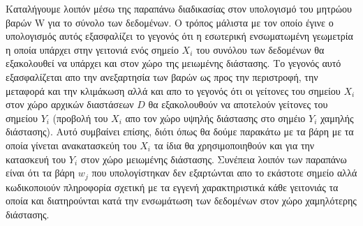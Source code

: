 \par
Καταλήγουμε λοιπόν μέσω της παραπάνω διαδικασίας στον υπολογισμό του μητρώου βαρών \textlatin{W} για το σύνολο των δεδομένων. Ο τρόπος μάλιστα με τον οποίο έγινε ο υπολογισμός αυτός εξασφαλίζει το γεγονός ότι η εσωτερική ενσωματωμένη γεωμετρία η οποία υπάρχει στην γειτονιά ενός σημείο $X_{i}$ του συνόλου των δεδομένων θα εξακολουθεί να υπάρχει και στον χώρο της μειωμένης διάστασης. Το γεγονός αυτό εξασφαλίζεται απο την ανεξαρτησία των βαρών ως προς την περιστροφή, την μεταφορά και την κλιμάκωση αλλά και απο το γεγονός ότι οι γείτονες του σημείου $X_{i}$ στον χώρο αρχικών διαστάσεων $D$ θα εξακολουθούν να αποτελούν γείτονες του σημείου $Y_{i}$ (προβολή του $X_{i}$ απο τον χώρο υψηλής διάστασης στο σημέιο $Y_{i}$ χαμηλής διάστασης). Αυτό συμβαίνει επίσης, διότι όπως θα δούμε παρακάτω με τα βάρη με τα οποία γίνεται ανακατασκεύη του $X_{i}$ τα ίδια θα χρησιμοποιηθούν και για την κατασκευή του $Y_{i}$ στον χώρο μειωμένης διάστασης. Συνέπεια λοιπόν των παραπάνω είναι ότι τα βάρη $w_{j}$ που υπολογίστηκαν δεν εξαρτώνται απο το εκάστοτε σημείο αλλά κωδικοποιούν πληροφορία σχετική με τα εγγενή χαρακτηριστικά κάθε γειτονιάς τα οποία και διατηρούνται κατά την ενσωμάτωση των δεδομένων στον χώρο χαμηλότερης διάστασης. 

